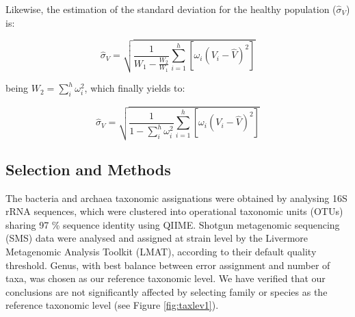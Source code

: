 Likewise, the estimation of the standard deviation for the healthy population ($\widehat{\sigma}_V$) is:
\begin{linenomath}
$$\widehat{\sigma}_V = \sqrt{\frac{1}{W_1-\frac{W_2}{W_1}}\sum_{i=1}^h\left[\omega_i\left(V_i-\hat{V}\right)^2\right]}$$
\end{linenomath}
being $W_2=\sum_i^h \omega_i^2$, which finally yields to:
\begin{linenomath}
$$\widehat{\sigma}_V = \sqrt{\frac{1}{1-\sum_i^h \omega_i^2}\sum_{i=1}^h\left[\omega_i\left(V_i-\hat{V}\right)^2\right]}$$
\end{linenomath}

\subsection*{Selection and Methods}

The bacteria and archaea taxonomic assignations were obtained by analysing 16S rRNA sequences, which were clustered into operational taxonomic units (OTUs) sharing 97 \% sequence identity using QIIME\cite{QIIME}. Shotgun metagenomic sequencing (SMS) data\cite{kwashiorkor} were analysed and assigned at strain level by the Livermore Metagenomic Analysis Toolkit (LMAT)\cite{LMAT}, according to their default quality threshold. Genus, with best balance between error assignment and number of taxa, was chosen as our reference taxonomic level. We have verified that our conclusions are not significantly affected by selecting family or species as the reference taxonomic level (see Figure \ref{fig:taxlev1}).

